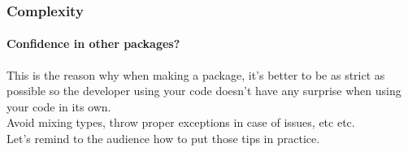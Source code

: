 \begin{frame}
    \frametitle{Complexity}
    \framesubtitle{Confidence in other packages?}

    This is the reason why when making a package, it's better to be as strict
    as possible so the developer using your code doesn't have any surprise when
    using your code in its own.\\
    \pause
    \vfill
    Avoid mixing types, throw proper exceptions in case of issues, etc etc.\\
    \pause
    \vfill
    Let's remind to the audience how to put those tips in practice.

\end{frame}
